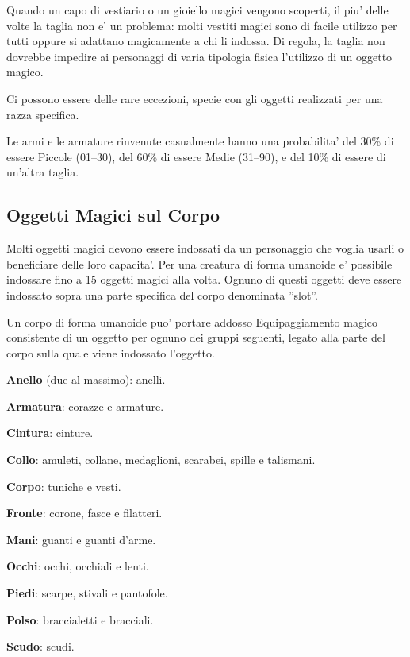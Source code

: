 \documentclass[a4paper,11pt,twoside,openany]{book}
\begin{document}
\label{taglia-e-oggetti-magici}

Quando un capo di vestiario o un gioiello magici vengono scoperti, il piu' delle volte la taglia non e' un problema: molti vestiti magici sono di facile utilizzo per tutti oppure si adattano magicamente a chi li indossa. Di regola, la taglia non dovrebbe impedire ai personaggi di varia tipologia fisica l'utilizzo di un oggetto magico. 

Ci possono essere delle rare eccezioni, specie con gli oggetti realizzati per una razza specifica.

Le armi e le armature rinvenute casualmente hanno una probabilita' del 30\% di essere Piccole (01--30), del 60\% di essere Medie (31--90), e del 10\% di essere di un'altra taglia.

\subsection{Oggetti Magici sul Corpo}

\label{oggetti-magici-sul-corpo}

Molti oggetti magici devono essere indossati da un personaggio che voglia usarli o beneficiare delle loro capacita'. Per una creatura di forma umanoide e' possibile indossare fino a 15 oggetti magici alla volta. Ognuno di questi oggetti deve essere indossato sopra una parte specifica del corpo denominata ''slot''.

Un corpo di forma umanoide puo' portare addosso Equipaggiamento magico consistente di un oggetto per ognuno dei gruppi seguenti, legato alla parte del corpo sulla quale viene indossato l'oggetto.

\textbf{Anello} (due al massimo): anelli.

\textbf{Armatura}: corazze e armature.

\textbf{Cintura}: cinture.

\textbf{Collo}: amuleti, collane, medaglioni, scarabei, spille e talismani.

\textbf{Corpo}: tuniche e vesti.

\textbf{Fronte}: corone, fasce e filatteri.

\textbf{Mani}: guanti e guanti d'arme.

\textbf{Occhi}: occhi, occhiali e lenti.

\textbf{Piedi}: scarpe, stivali e pantofole.

\textbf{Polso}: braccialetti e bracciali.

\textbf{Scudo}: scudi.
\end{document}
